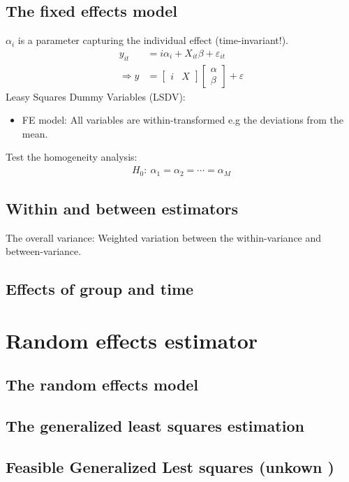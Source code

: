 \begin{multicols}{2}
\subsection{The fixed effects model}
$\alpha_i$ is a parameter capturing the individual effect (time-invariant!).
\begin{align*}
    y_{it}&=i\alpha_i+X_{it}\beta+\varepsilon_{it}\\
    \Rightarrow y &= [\begin{array}{cc}i & X\end{array}] \left[\begin{array}{c}\alpha \\ \beta\end{array}\right] + \varepsilon
\end{align*}
Leasy Squares Dummy Variables (LSDV):
\begin{itemize}
  \item FE model: All variables are within-transformed e.g the deviations from the mean.
\end{itemize}
Test the homogeneity analysis:
\begin{align*}
  H_0:\ \alpha_1=\alpha_2=\cdots=\alpha_M
\end{align*}


\subsection{Within and between estimators}
The overall variance: Weighted variation between the within-variance and between-variance.


\subsection{Effects of group and time}


\end{multicols}

\section{Random effects estimator} %
\begin{multicols}{2}
\subsection{The random effects model}


\subsection{The generalized least squares estimation}


\subsection{Feasible Generalized Lest squares (unkown )}



\end{multicols}


